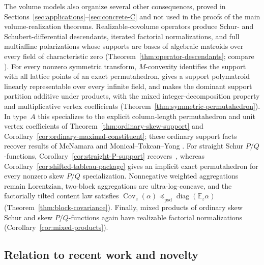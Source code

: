 \documentclass[11pt,a4paper,oneside]{amsart}
\numberwithin{equation}{section}
\theoremstyle{definition}
\theoremstyle{remark}
\DeclareMathOperator{\diag}{diag}
\DeclareMathOperator{\Cov}{Cov}
\begin{document}
The volume models also organize several other consequences, proved in
Sections~\ref{sec:applications}--\ref{sec:concrete-C} and not used in the
proofs of the main volume-realization theorems.  Realizable-covolume operators
produce Schur- and Schubert-differential descendants, iterated factorial
normalizations, and full multiaffine polarizations whose supports are bases of
algebraic matroids over every field of characteristic zero
(Theorem~\ref{thm:operator-descendants}; compare
\cite[Theorem~1.3, Corollary~2.4, and Propositions~2.10, 4.1, 4.2,
and~5.4]{GHMSW25}).  For every nonzero symmetric transform, $M$-convexity
identifies the support with all lattice points of an exact permutahedron,
gives a support polymatroid linearly representable over every infinite field,
and makes the dominant support partition additive under products, with the
mixed integer-decomposition property and multiplicative vertex coefficients
(Theorem~\ref{thm:symmetric-permutahedron}).  In type~$A$ this specializes to
the explicit column-length permutahedron and unit vertex coefficients of
Theorem~\ref{thm:ordinary-skew-support} and
Corollary~\ref{cor:ordinary-maximal-constituent}; these ordinary support facts
recover results of McNamara and Monical--Tokcan--Yong
\cite[Proposition~3.1]{McNamara08}\cite[Corollary~5.10]{MTY19}.
For straight Schur $P/Q$-functions, Corollary~\ref{cor:straight-P-support}
recovers~\cite[Proposition~3.5]{MTY19}, whereas
Corollary~\ref{cor:shifted-tableau-package} gives an implicit exact
permutahedron for every nonzero skew $P/Q$ specialization.  Nonnegative
weighted aggregations remain Lorentzian, two-block aggregations are
ultra-log-concave, and the factorially tilted content law satisfies
$\Cov_z(\alpha)\preceq_{\mathrm{psd}}\diag(\mathbb E_z\alpha)$
(Theorem~\ref{thm:block-covariance}).  Finally, mixed products of ordinary
skew Schur and skew $P/Q$-functions again have realizable factorial
normalizations (Corollary~\ref{cor:mixed-products}).

\subsection{Relation to recent work and novelty}\label{subsec:recent-work-novelty}
\end{document}
